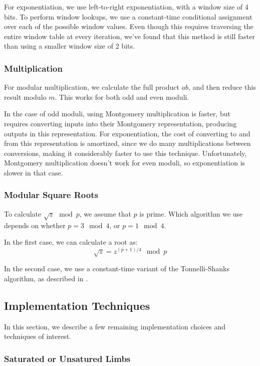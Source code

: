 \documentclass[11pt, a4paper]{article} %
\begin{document}
{For exponentiation, we use left-to-right exponentiation,
with a window size of 4 bits. To perform window lookups,
we use a constant-time conditional assignment
over each of the possible window values. Even though this requires traversing
the entire window table at every iteration, we've found that this method
is still faster than using a smaller window size of 2 bits.

\subsubsection{Multiplication}

For modular multiplication, we calculate the full product
$ab$, and then reduce this result modulo $m$. This works
for both odd and even moduli.

In the case of odd moduli, using Montgomery multiplication
\cite{kaya_koc_analyzing_1996-1, pornin_bearssl_2020-1} is
faster, but requires converting inputs into their Montgomery
representation, producing outputs in this representation.
For exponentiation,
the cost of converting to and from this representation is amortized,
since we do many multiplications between conversions, making
it considerably faster to use this technique. Unfortunately,
Montgomery multiplication doesn't work for even moduli,
so exponentiation is slower in that case.

\subsubsection{Modular Square Roots}

To calculate $\sqrt{z} \mod p$, we assume that $p$ is prime.
Which algorithm we use depends on whether $p = 3 \mod 4$,
or $p = 1 \mod 4$.

In the first case, we can calculate a root as:
$$
\sqrt{z} = z^{(p + 1) / 4} \mod p
$$

In the second case, we use a constant-time variant
of the Tonnelli-Shanks algorithm, as described in 
\cite{wahby_hashing_nodate}.

\subsection{Implementation Techniques}

In this section, we describe a few remaining implementation choices
and techniques of interest.

\subsubsection{Saturated or Unsatured Limbs}

}
\end{document}
